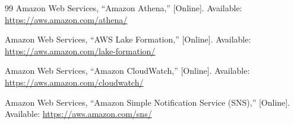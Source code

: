 \documentclass{article}
\begin{document}
\begin{thebibliography}{99}
Amazon Web Services, ``Amazon Athena,'' [Online]. Available: \url{https://aws.amazon.com/athena/}

Amazon Web Services, ``AWS Lake Formation,'' [Online]. Available: \url{https://aws.amazon.com/lake-formation/}

Amazon Web Services, ``Amazon CloudWatch,'' [Online]. Available: \url{https://aws.amazon.com/cloudwatch/}

Amazon Web Services, ``Amazon Simple Notification Service (SNS),'' [Online]. Available: \url{https://aws.amazon.com/sns/}

\end{thebibliography}
\end{document}
